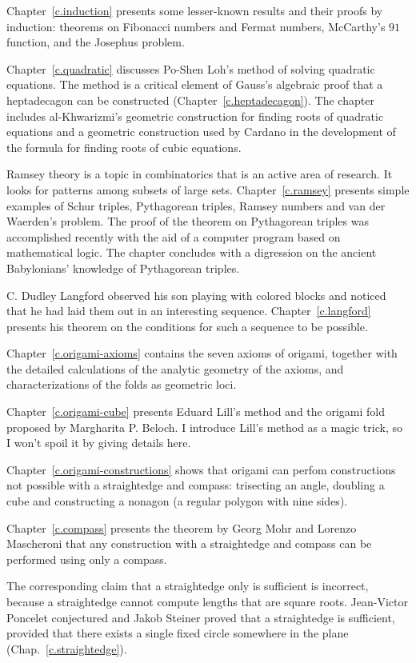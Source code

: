 Chapter~\ref{c.induction} presents some lesser-known results and their proofs by induction: theorems on Fibonacci numbers and Fermat numbers, McCarthy's $91$ function, and the Josephus problem.

Chapter~\ref{c.quadratic} discusses Po-Shen Loh's method of solving quadratic equations. The method is a critical element of Gauss's algebraic proof that a heptadecagon can be constructed (Chapter~\ref{c.heptadecagon}). The chapter includes al-Khwarizmi's geometric construction for finding roots of quadratic equations and a geometric construction used by Cardano in the development of the formula for finding roots of cubic equations.

Ramsey theory is a topic in combinatorics that is an active area of research. It looks for patterns among subsets of large sets. Chapter~\ref{c.ramsey} presents simple examples of Schur triples, Pythagorean triples, Ramsey numbers and van der Waerden's problem. The proof of the theorem on Pythagorean triples was accomplished recently with the aid of a computer program based on mathematical logic. The chapter concludes with a digression on the ancient Babylonians' knowledge of Pythagorean triples.

C. Dudley Langford observed his son playing with colored blocks and noticed that he had laid them out in an interesting sequence. Chapter~\ref{c.langford} presents his theorem on the conditions for such a sequence to be possible.

Chapter~\ref{c.origami-axioms} contains the seven axioms of origami, together with the detailed calculations of the analytic geometry of the axioms, and characterizations of the folds as geometric loci.

Chapter~\ref{c.origami-cube} presents Eduard Lill's method and the origami fold proposed by Margharita P. Beloch. I introduce Lill's method as a magic trick, so I won't spoil it by giving details here.

Chapter~\ref{c.origami-constructions} shows that origami can perfom constructions not possible with a straightedge and compass: trisecting an angle, doubling a cube and constructing a nonagon (a regular polygon with nine sides).

Chapter~\ref{c.compass} presents the theorem by Georg Mohr and Lorenzo Mascheroni that any construction with a straightedge and compass can be performed using only a compass.

The corresponding claim that a straightedge only is sufficient is  incorrect, because a straightedge cannot compute lengths that are square roots. Jean-Victor Poncelet conjectured and Jakob Steiner proved that a straightedge is sufficient, provided that there exists a single fixed circle somewhere in the plane (Chap.~\ref{c.straightedge}).

